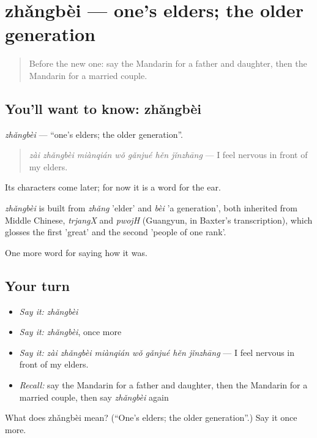 \section[zhǎngbèi]{zhǎngbèi — one's elders; the older generation}

\label{lesson:ZH-C507-zhangbei}



\begin{quote}
Before the new one: say the Mandarin for a father and daughter, then the Mandarin for a married couple.
\end{quote}

\subsection*{You'll want to know: zhǎngbèi}
\emph{zhǎngbèi} — \textquotedblleft{}one's elders; the older generation\textquotedblright{}.

\begin{quote}
\emph{zài zhǎngbèi miànqián wǒ gǎnjué hěn jǐnzhāng} — I feel nervous in front of my elders.
\end{quote}

Its characters come later; for now it is a word for the ear.

\begin{cousinweb}
\emph{zhǎngbèi} is built from \emph{zhǎng} 'elder' and \emph{bèi} 'a generation', both inherited from Middle Chinese, \emph{trjangX} and \emph{pwojH} (Guangyun, in Baxter's transcription), which glosses the first 'great' and the second 'people of one rank'.
\end{cousinweb}

\begin{grammarlens}[title={What you've built}]
One more word for saying how it was.
\end{grammarlens}

\subsection*{Your turn}
\begin{itemize}
\raggedright
  \item \emph{Say it:} \emph{zhǎngbèi}
  \item \emph{Say it:} \emph{zhǎngbèi}, once more
  \item \emph{Say it:} \emph{zài zhǎngbèi miànqián wǒ gǎnjué hěn jǐnzhāng} — I feel nervous in front of my elders.
  \item \emph{Recall:} say the Mandarin for a father and daughter, then the Mandarin for a married couple, then say \emph{zhǎngbèi} again
\end{itemize}

\begin{tcolorbox}[breakable,colback=teal!4,colframe=teal!35!black,title={Before you move on}]
What does zhǎngbèi mean? (\textquotedblleft{}One's elders; the older generation\textquotedblright{}.) Say it once more.
\end{tcolorbox}
